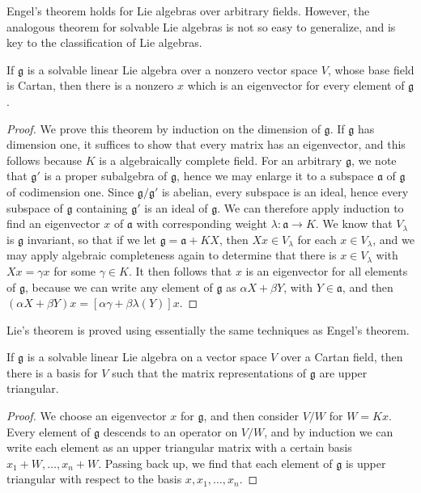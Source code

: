 Engel's theorem holds for Lie algebras over arbitrary fields. However, the analogous theorem for solvable Lie algebras is not so easy to generalize, and is key to the classification of Lie algebras.

\begin{lemma}
    If $\mathfrak{g}$ is a solvable linear Lie algebra over a nonzero vector space $V$, whose base field is Cartan, then there is a nonzero $x$ which is an eigenvector for every element of $\mathfrak{g}$.
\end{lemma}
\begin{proof}
    We prove this theorem by induction on the dimension of $\mathfrak{g}$. If $\mathfrak{g}$ has dimension one, it suffices to show that every matrix has an eigenvector, and this follows because $K$ is a algebraically complete field. For an arbitrary $\mathfrak{g}$, we note that $\mathfrak{g}'$ is a proper subalgebra of $\mathfrak{g}$, hence we may enlarge it to a subspace $\mathfrak{a}$ of $\mathfrak{g}$ of codimension one. Since $\mathfrak{g}/\mathfrak{g}'$ is abelian, every subspace is an ideal, hence every subspace of $\mathfrak{g}$ containing $\mathfrak{g}'$ is an ideal of $\mathfrak{g}$. We can therefore apply induction to find an eigenvector $x$ of $\mathfrak{a}$ with corresponding weight $\lambda: \mathfrak{a} \to K$. We know that $V_\lambda$ is $\mathfrak{g}$ invariant, so that if we let $\mathfrak{g} = \mathfrak{a} + KX$, then $Xx \in V_\lambda$ for each $x \in V_\lambda$, and we may apply algebraic completeness again to determine that there is $x \in V_\lambda$ with $Xx = \gamma x$ for some $\gamma \in K$. It then follows that $x$ is an eigenvector for all elements of $\mathfrak{g}$, because we can write any element of $\mathfrak{g}$ as $\alpha X + \beta Y$, with $Y \in \mathfrak{a}$, and then $(\alpha X + \beta Y)x = [\alpha \gamma + \beta \lambda(Y)]x$.
\end{proof}

Lie's theorem is proved using essentially the same techniques as Engel's theorem.

\begin{theorem}
    If $\mathfrak{g}$ is a solvable linear Lie algebra on a vector space $V$ over a Cartan field, then there is a basis for $V$ such that the matrix representations of $\mathfrak{g}$ are upper triangular.
\end{theorem}
\begin{proof}
    We choose an eigenvector $x$ for $\mathfrak{g}$, and then consider $V/W$ for $W = Kx$. Every element of $\mathfrak{g}$ descends to an operator on $V/W$, and by induction we can write each element as an upper triangular matrix with a certain basis $x_1 + W, \dots, x_n + W$. Passing back up, we find that each element of $\mathfrak{g}$ is upper triangular with respect to the basis $x, x_1, \dots, x_n$.
\end{proof}

